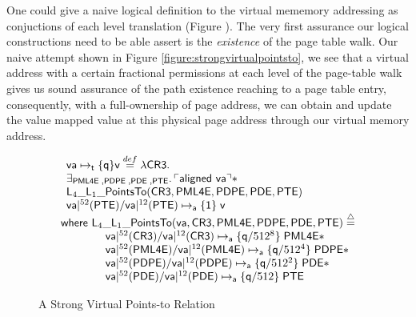 \begin{remark}
  \label{rem:strongvmem}
  One could give a naive logical definition to the virtual mememory addressing as conjuctions of each level translation (Figure ). The very first assurance our logical constructions need to be able assert is the \textit{existence} of the page table walk. Our naive attempt shown in Figure \ref{figure:strongvirtualpointsto}, we see that a virtual address with a certain fractional permissions at each level of the page-table walk gives us sound assurance of the path existence reaching to a page table entry, consequently, with a full-ownership of page address, we can obtain and update the value mapped value at this physical page address through our virtual memory address. 

\begin{figure}
  \[
  \begin{array}{l}
\begin{array}{l}
  \mathsf{va}\mapsto_{\textsf{t}}\{\textsf{q}\}\textsf{v} \stackrel{def}{=} \lambda \textsf{CR3}.\\
  \exists_{\textsf{PML4E} \;, \textsf{PDPE} \;, \textsf{PDE} \;,\textsf{PTE}} \ldotp 

  \ulcorner \textsf{aligned } \mathsf{va} \urcorner \ast  \\
  \textsf{L}_{4}\_\textsf{L}_{1}\_\textsf{PointsTo}(\textsf{CR3},\textsf{PML4E},\textsf{PDPE},\textsf{PDE},\textsf{PTE})\\
   \mathsf{va}|^{52}(\textsf{PTE}) / \mathsf{va}|^{12}(\textsf{PTE}) \mapsto_{\mathsf{a}}\{\mathsf{1}\}\;\textsf{v} 
\end{array} \\

\textsf{where   }\textsf{L}_{4}\_\textsf{L}_{1}\_\textsf{PointsTo}(\mathsf{va},\textsf{CR3},\textsf{PML4E},\textsf{PDPE},\textsf{PDE},\textsf{PTE}) \stackrel{\triangle}{=} \\
 \qquad\qquad \mathsf{va}|^{52}(\textsf{CR3}) / \mathsf{va}|^{12}(\textsf{CR3}) \mapsto_{\mathsf{a}}\{\mathsf{q}/512^{8}\}\;\textsf{PML4E} \ast \\ 
 \qquad\qquad  \mathsf{va}|^{52}(\textsf{PML4E}) / \mathsf{va}|^{12}(\textsf{PML4E}) \mapsto_{\mathsf{a}}\{\mathsf{q}/512^{4}\}\;\textsf{PDPE}  \ast  \\
  \qquad\qquad \mathsf{va}|^{52}(\textsf{PDPE}) / \mathsf{va}|^{12}(\textsf{PDPE}) \mapsto_{\mathsf{a}}\{\mathsf{q}/512^{2}\}\;\textsf{PDE} \ast \\
  \qquad\qquad \mathsf{va}|^{52}(\textsf{PDE}) / \mathsf{va}|^{12}(\textsf{PDE}) \mapsto_{\mathsf{a}}\{\mathsf{q}/512\}\;\textsf{PTE} 
   \end{array}
\]
\caption{A Strong Virtual Points-to Relation}
  \label{fig:strongvirtualpointsto}
\end{figure}
\end{remark}

